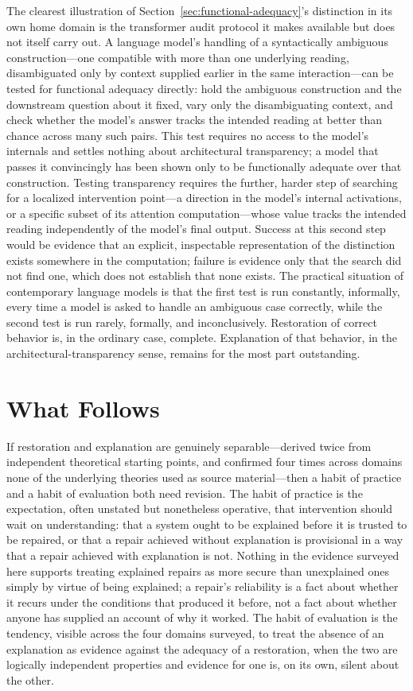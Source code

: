 \documentclass[11pt]{article}
\theoremstyle{plain}
\begin{document}
The clearest illustration of Section~\ref{sec:functional-adequacy}'s distinction in its own home domain is the transformer audit protocol it makes available but does not itself carry out. A language model's handling of a syntactically ambiguous construction---one compatible with more than one underlying reading, disambiguated only by context supplied earlier in the same interaction---can be tested for functional adequacy directly: hold the ambiguous construction and the downstream question about it fixed, vary only the disambiguating context, and check whether the model's answer tracks the intended reading at better than chance across many such pairs. This test requires no access to the model's internals and settles nothing about architectural transparency; a model that passes it convincingly has been shown only to be functionally adequate over that construction. Testing transparency requires the further, harder step of searching for a localized intervention point---a direction in the model's internal activations, or a specific subset of its attention computation---whose value tracks the intended reading independently of the model's final output. Success at this second step would be evidence that an explicit, inspectable representation of the distinction exists somewhere in the computation; failure is evidence only that the search did not find one, which does not establish that none exists. The practical situation of contemporary language models is that the first test is run constantly, informally, every time a model is asked to handle an ambiguous case correctly, while the second test is run rarely, formally, and inconclusively. Restoration of correct behavior is, in the ordinary case, complete. Explanation of that behavior, in the architectural-transparency sense, remains for the most part outstanding.

\section{What Follows}
\label{sec:conclusion}

If restoration and explanation are genuinely separable---derived twice from independent theoretical starting points, and confirmed four times across domains none of the underlying theories used as source material---then a habit of practice and a habit of evaluation both need revision. The habit of practice is the expectation, often unstated but nonetheless operative, that intervention should wait on understanding: that a system ought to be explained before it is trusted to be repaired, or that a repair achieved without explanation is provisional in a way that a repair achieved with explanation is not. Nothing in the evidence surveyed here supports treating explained repairs as more secure than unexplained ones simply by virtue of being explained; a repair's reliability is a fact about whether it recurs under the conditions that produced it before, not a fact about whether anyone has supplied an account of why it worked. The habit of evaluation is the tendency, visible across the four domains surveyed, to treat the absence of an explanation as evidence against the adequacy of a restoration, when the two are logically independent properties and evidence for one is, on its own, silent about the other.
\end{document}

